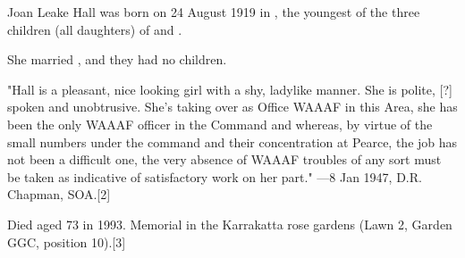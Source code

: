
Joan Leake Hall was born on 24 August 1919 in ,\cite{JLHbirth}
the youngest of the three children (all daughters)
of  and .

She married , and they had no children.

"Hall is a pleasant, nice looking girl with a shy, ladylike manner.
She is polite, [?] spoken and unobtrusive.
She's taking over as Office WAAAF in this Area, she has been the only WAAAF officer in the Command and whereas,
by virtue of the small numbers under the command and their concentration at Pearce,
the job has not been a difficult one, the very absence of WAAAF troubles of any sort must be taken as indicative
of satisfactory work on her part." —8 Jan 1947, D.R. Chapman, SOA.[2]

Died aged 73 in 1993. Memorial in the Karrakatta rose gardens (Lawn 2, Garden GGC, position 10).[3]
